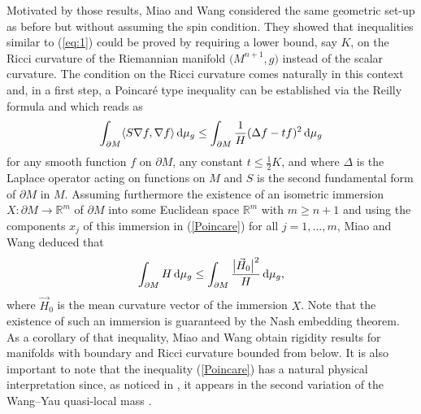 \documentclass[pdftex]{sigma}
\numberwithin{equation}{section}
\begin{document}
Motivated by those results, Miao and Wang \cite{MiaoWang14} considered the same geo\-me\-tric
set-up as before but without assuming the spin condition.
They showed that i\-ne\-qua\-li\-ties similar to (\ref{eq:1}) could be proved by requiring a
lower bound, say $K$, on the Ricci curvature of the Riemannian ma\-ni\-fold
$\bigl(M^{n+1},g\bigr)$ instead of the scalar curvature.
The condition on the Ricci curvature comes naturally in this context and, in a first step, a Poincar\'e type i\-ne\-qua\-li\-ty \cite[Theorem 2.1]{MiaoWang14} can be established via the Reilly formula and which reads as
\begin{equation}\label{Poincare}
\int_{\partial M}\langle S\nabla f,\nabla f\rangle\,{\rm d}\mu_g\leq \int_{\partial M}\frac{1}{H}(\Delta f-tf)^2
\,{\rm d}\mu_g
\end{equation}
for any smooth function $f$ on $\partial M$,  any constant $t\leq \frac{1}{2}K$, and where $\Delta$ is the Laplace operator acting on functions on $M$ and $S$ is the second fundamental form of $\partial M$ in $M$.
Assuming furthermore the existence of an isometric immersion $X\colon
\partial M\rightarrow\mathbb{R}^m$ of $\partial M$ into some Euclidean space $\mathbb{R}^m$ with
$m\geq n+1$ and using the components $x_j$ of this immersion in (\ref{Poincare})
for all $j=1,\dots,m$, Miao and Wang deduced that
\[
\int_{\partial M}H\,{\rm d}\mu_g\leq \int_{\partial M}\frac{\bigl|\vec{H}_0\bigr|^2}{H}\,{\rm d}\mu_g,
\]
where $\vec{H}_0$ is the mean curvature vector of the immersion $X$.
Note that the e\-xis\-ten\-ce of such an immersion is guaranteed by the Nash
embedding theorem.
As a corollary of that i\-ne\-qua\-li\-ty, Miao and Wang obtain rigidity results for ma\-ni\-folds with boundary and Ricci curvature bounded from
below.
It is also important to note that the i\-ne\-qua\-li\-ty (\ref{Poincare}) has a natural
physical interpretation since, as noticed in \cite{MT,MTX}, it appears in the
second variation of the Wang--Yau quasi-local mass \cite{WY}.
\end{document}
